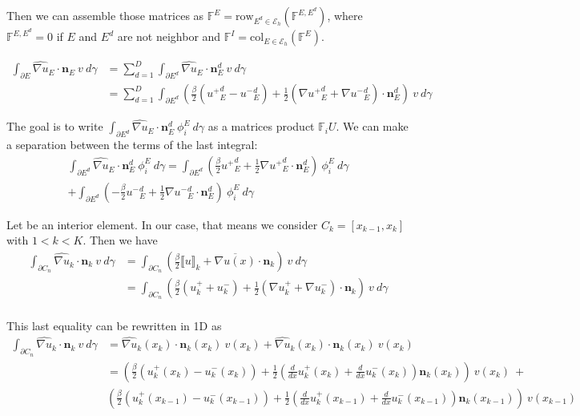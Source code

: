 \documentclass[a4paper,10pt,draft]{article}
\begin{document}
Then we can assemble those matrices as $\mathbb{F}^E = \mathrm{row}_{E^d \in \mathcal{E}_h} 
(\mathbb{F}^{E,E^d})$, where $\mathbb{F}^{E,E^d} = 0$ if $E$ and $E^d$ are not neighbor and 
$\mathbb{F}^I = \mathrm{col}_{E \in \mathcal{E}_h} 
(\mathbb{F}^E)$.
\iffalse
{\itshape
\begin{align*}
  \int_{\partial E} \widehat{\nabla u}_E \cdot \mathbf{n}_E\ v\ d\gamma &=
  \sum_{d=1}^D \int_{\partial E^d} \widehat{\nabla u}_E \cdot \mathbf{n}_E^d\ v\ d\gamma \\
  &= \sum_{d=1}^D \int_{\partial E^d} \left(\frac{\beta}{2} ({u^+}_E^d - {u^-}_E^d) + \frac{1}{2} 
(\nabla {u^+}_E^d + \nabla {u^-}_E^d) \cdot \mathbf{n}_E^d \right)\ v\ d\gamma
\end{align*}

The goal is to write $\int_{\partial E^d} \widehat{\nabla u}_E \cdot \mathbf{n}_E^d\ \phi_i^E \ 
d\gamma$ as a matrices product $\mathbb{F}_i U$. We can make a separation between the terms of the 
last integral:
\begin{multline*}
 \int_{\partial E^d} \widehat{\nabla u}_E \cdot \mathbf{n}_E^d\ \phi_i^E \ d\gamma
= \int_{\partial E^d} \left( \frac{\beta}{2} {u^+}_E^d + \frac{1}{2} \nabla {u^+}_E^d \cdot 
\mathbf{n}_E^d \right) \ \phi_i^E\ d\gamma \\
+ \int_{\partial E^d} \left( -\frac{\beta}{2} {u^-}_E^d + \frac{1}{2} \nabla {u^-}_E^d \cdot 
\mathbf{n}_E^d \right) \ \phi_i^E\ d\gamma
 \end{multline*}





Let be an interior element. In our case, that means we consider $C_k = [x_{k-1},x_k]$ with $1<k<K$. 
Then we have
\begin{align*}
 \int_{\partial C_n} \widehat{\nabla u}_k \cdot \mathbf{n}_k\ v\ d\gamma &= \int_{\partial C_n} 
\left(\frac{\beta}{2} \llbracket u \rrbracket_k + \overline{\nabla u(x)} \cdot \mathbf{n}_k 
\right)\ v\ d\gamma \\
&= \int_{\partial C_n} \left(\frac{\beta}{2} (u^+_k + u^-_k) + \frac{1}{2} (\nabla u^+_k + \nabla 
u^-_k) \cdot \mathbf{n}_k \right)\ v\ d\gamma \\
\end{align*}

This last equality can be rewritten in 1D as
\begin{align*}
 \int_{\partial C_n} \widehat{\nabla u}_k \cdot \mathbf{n}_k\ v\ d\gamma &= \widehat{\nabla 
u}_k(x_k) \cdot \mathbf{n}_k(x_k)\ v(x_k) + \widehat{\nabla u}_k(x_k) \cdot \mathbf{n}_k(x_k)\ 
v(x_k)\\
 &=\left(\frac{\beta}{2} (u^+_k(x_k) - u^-_k(x_k)) + \frac{1}{2} \left(\frac{d}{dx} u^+_k(x_k) + 
\frac{d}{dx} u^-_k(x_k)\right) \mathbf{n}_k(x_k) \right)\ v(x_k) \ + \\
& \left(\frac{\beta}{2} (u^+_k(x_{k-1}) - u^-_k(x_{k-1})) + \frac{1}{2} \left(\frac{d}{dx} 
u^+_k(x_{k-1}) + \frac{d}{dx} u^-_k(x_{k-1})\right)\mathbf{n}_k(x_{k-1}) \right)\ v(x_{k-1})
\end{align*}

}
\end{document}
